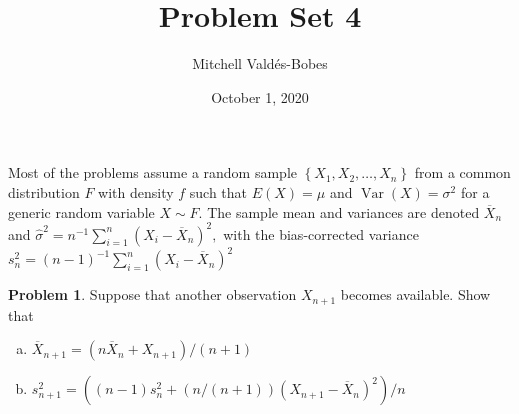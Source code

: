 \documentclass{article}
\title{Problem Set 4}
\author{Mitchell Valdés-Bobes}
\date{October 1, 2020}
\theoremstyle{definition}
\newtheorem{problem}{Problem}
\begin{document}
\maketitle

Most of the problems assume a random sample $\left\{X_{1}, X_{2}, \ldots, X_{n}\right\}$ from a common distribution $F$ with density $f$ such that $E(X)=\mu$ and $\operatorname{Var}(X)=\sigma^{2}$ for a generic random variable $X \sim F .$ The sample mean and variances are denoted $\overline{X}_{n}$ and $\hat{\sigma}^{2}=n^{-1} \sum_{i=1}^{n}\left(X_{i}-\overline{X}_{n}\right)^{2},$ with the bias-corrected variance $s_{n}^{2}=(n-1)^{-1} \sum_{i=1}^{n}\left(X_{i}-\overline{X}_{n}\right)^{2}$

\begin{problem}
Suppose that another observation $X_{n+1}$ becomes available. Show that
\begin{enumerate}[(a)]
    \item $\overline{X}_{n+1}=\left(n \overline{X}_{n}+X_{n+1}\right) /(n+1)$
    \item  $s_{n+1}^{2}=\left((n-1) s_{n}^{2}+(n /(n+1))\left(X_{n+1}-\overline{X}_{n}\right)^{2}\right) / n$
\end{enumerate}

\end{problem}
\end{document}
